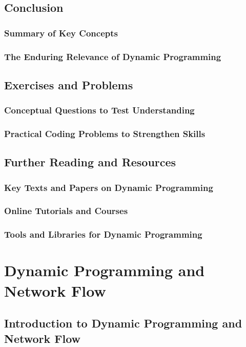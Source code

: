 \documentclass[12pt]{book} %
\begin{document}
\section{Conclusion}
\subsection{Summary of Key Concepts}
\subsection{The Enduring Relevance of Dynamic Programming}

\section{Exercises and Problems}
\subsection{Conceptual Questions to Test Understanding}
\subsection{Practical Coding Problems to Strengthen Skills}

\section{Further Reading and Resources}
\subsection{Key Texts and Papers on Dynamic Programming}
\subsection{Online Tutorials and Courses}
\subsection{Tools and Libraries for Dynamic Programming}


\chapter{Dynamic Programming and Network Flow}

\section{Introduction to Dynamic Programming and Network Flow}
\end{document}
